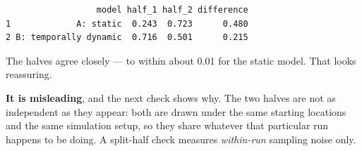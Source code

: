 \documentclass[
  letterpaper,
  DIV=11,
  numbers=noendperiod]{scrartcl}
\newenvironment{Shaded}{\begin{snugshade}}{\end{snugshade}}
\newcommand{\AttributeTok}[1]{\textcolor[rgb]{0.40,0.45,0.13}{#1}}
\newcommand{\ControlFlowTok}[1]{\textcolor[rgb]{0.00,0.23,0.31}{\textbf{#1}}}
\newcommand{\DecValTok}[1]{\textcolor[rgb]{0.68,0.00,0.00}{#1}}
\newcommand{\FunctionTok}[1]{\textcolor[rgb]{0.28,0.35,0.67}{#1}}
\newcommand{\NormalTok}[1]{\textcolor[rgb]{0.00,0.23,0.31}{#1}}
\newcommand{\OtherTok}[1]{\textcolor[rgb]{0.00,0.23,0.31}{#1}}
\newcommand{\SpecialCharTok}[1]{\textcolor[rgb]{0.37,0.37,0.37}{#1}}
\newcommand{\StringTok}[1]{\textcolor[rgb]{0.13,0.47,0.30}{#1}}
\begin{document}
\begin{Shaded}
\end{Shaded}

\begin{verbatim}
                  model half_1 half_2 difference
1             A: static  0.243  0.723      0.480
2 B: temporally dynamic  0.716  0.501      0.215
\end{verbatim}

The halves agree closely --- to within about 0.01 for the static model.
That looks reassuring.

\textbf{It is misleading}, and the next check shows why. The two halves
are not as independent as they appear: both are drawn under the same
starting locations and the same simulation setup, so they share whatever
that particular run happens to be doing. A split-half check measures
\emph{within-run} sampling noise only.
\end{document}
